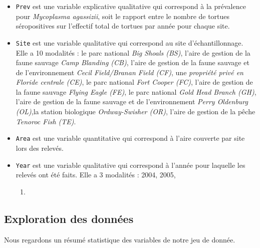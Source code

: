 \documentclass[
]{article}
\providecommand{\tightlist}{%
  \setlength{\itemsep}{0pt}\setlength{\parskip}{0pt}}
\begin{document}
\begin{itemize}
\item
  \texttt{Prev} est une variable explicative qualitative qui correspond
  à la prévalence pour \emph{Mycoplasma agassizii}, soit le rapport
  entre le nombre de tortues séropositives sur l'effectif total de
  tortues par année pour chaque site.
\item
  \texttt{Site} est une variable qualitative qui correspond au site
  d'échantillonnage. Elle a 10 modalités : le parc national \emph{Big
  Shoals (BS)}, l'aire de gestion de la faune sauvage \emph{Camp
  Blanding (CB)}, l'aire de gestion de la faune sauvage et de
  l'environnement \emph{Cecil Field/Branan Field (CF)}, une
  \emph{propriété privé en Floride centrale (CE)}, le parc national
  \emph{Fort Cooper (FC)}, l'aire de gestion de la faune sauvage
  \emph{Flying Eagle (FE)}, le parc national \emph{Gold Head Branch
  (GH)}, l'aire de gestion de la faune sauvage et de l'environnement
  \emph{Perry Oldenburg (OL)},la station biologique \emph{Ordway-Swisher
  (OR)}, l'aire de gestion de la pêche \emph{Tenoroc Fish (TE)}.
\item
  \texttt{Area} est une variable quantitative qui correspond à l'aire
  couverte par site lors des relevés.
\item
  \texttt{Year} est une variable qualitative qui correspond à l'année
  pour laquelle les relevés ont été faits. Elle a 3 modalités : 2004,
  2005,

  \begin{enumerate}
  \def\labelenumi{\arabic{enumi}.}
  \setcounter{enumi}{2005}
  \tightlist
  \item
  \end{enumerate}
\end{itemize}

\hypertarget{exploration-des-donnuxe9es}{%
\subsection{Exploration des données}\label{exploration-des-donnuxe9es}}

Nous regardons un résumé statistique des variables de notre jeu de
donnée.
\end{document}

